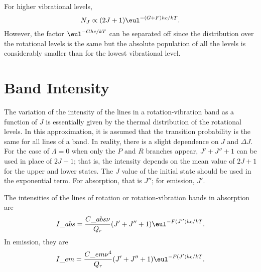 For higher vibrational levels,
\begin{equation}
    N_J \propto (2J + 1)\eul^{-(G + F)hc/kT}.
\end{equation}
However, the factor $\eul^{-Ghc/kT}$ can be separated off since the distribution over the rotational levels is the same but the absolute population of all the levels is considerably smaller than for the lowest vibrational level.

\section{Band Intensity}
\label{s:band_intensity}

The variation of the intensity of the lines in a rotation-vibration band as a function of $J$ is essentially given by the thermal distribution of the rotational levels. In this approximation, it is assumed that the transition probability is the same for all lines of a band. In reality, there is a slight dependence on $J$ and $\Delta{}J$. For the case of $\Lambda = 0$ when only the $P$ and $R$ branches appear, $J' + J'' + 1$ can be used in place of $2J + 1$; that is, the intensity depends on the mean value of $2J + 1$ for the upper and lower states. The $J$ value of the initial state should be used in the exponential term. For absorption, that is $J''$; for emission, $J'$.

The intensities of the lines of rotation or rotation-vibration bands in absorption are
\begin{equation}
    I\_{abs} = \frac{C\_{abs}\nu}{Q_r}(J' + J'' + 1)\eul^{-F(J'')hc/kT}.
\end{equation}
In emission, they are
\begin{equation}
    I\_{em} = \frac{C\_{em}\nu^4}{Q_r}(J' + J'' + 1)\eul^{-F(J')hc/kT}.
\end{equation}
